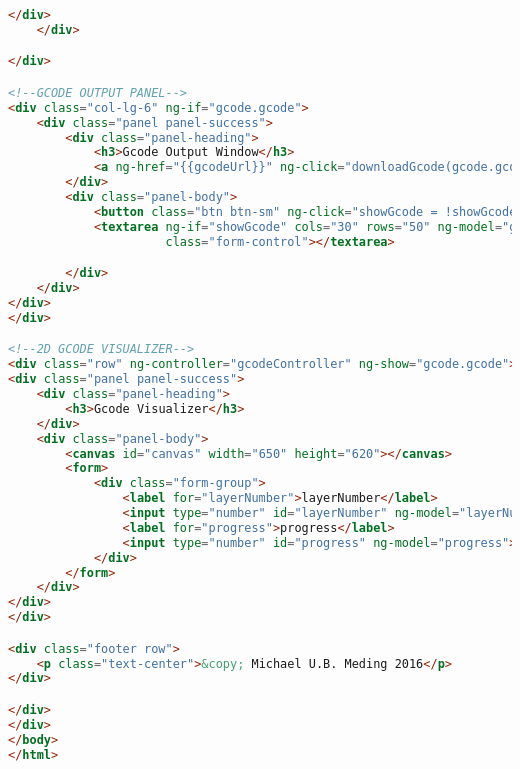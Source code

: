 \begin{lstlisting}[language=HTML, label={lst:index}, caption=As this is a single page web application this is the only HTML file. It contains all of the libraries needed to run all subsequent sections.]
        </div>
    </div>

</div>

<!--GCODE OUTPUT PANEL-->
<div class="col-lg-6" ng-if="gcode.gcode">
    <div class="panel panel-success">
        <div class="panel-heading">
            <h3>Gcode Output Window</h3>
            <a ng-href="{{gcodeUrl}}" ng-click="downloadGcode(gcode.gcode)">download gcode</a>
        </div>
        <div class="panel-body">
            <button class="btn btn-sm" ng-click="showGcode = !showGcode" data-toggle="tooltip" data-placement="bottom" title="WARNING! This may freeze browser!">press to view gcode</button>
            <textarea ng-if="showGcode" cols="30" rows="50" ng-model="gcode.gcode"
                      class="form-control"></textarea>

        </div>
    </div>
</div>
</div>

<!--2D GCODE VISUALIZER-->
<div class="row" ng-controller="gcodeController" ng-show="gcode.gcode">
<div class="panel panel-success">
    <div class="panel-heading">
        <h3>Gcode Visualizer</h3>
    </div>
    <div class="panel-body">
        <canvas id="canvas" width="650" height="620"></canvas>
        <form>
            <div class="form-group">
                <label for="layerNumber">layerNumber</label>
                <input type="number" id="layerNumber" ng-model="layerNumber">
                <label for="progress">progress</label>
                <input type="number" id="progress" ng-model="progress">
            </div>
        </form>
    </div>
</div>
</div>

<div class="footer row">
    <p class="text-center">&copy; Michael U.B. Meding 2016</p>
</div>

</div>
</div>
</body>
</html>
\end{lstlisting}